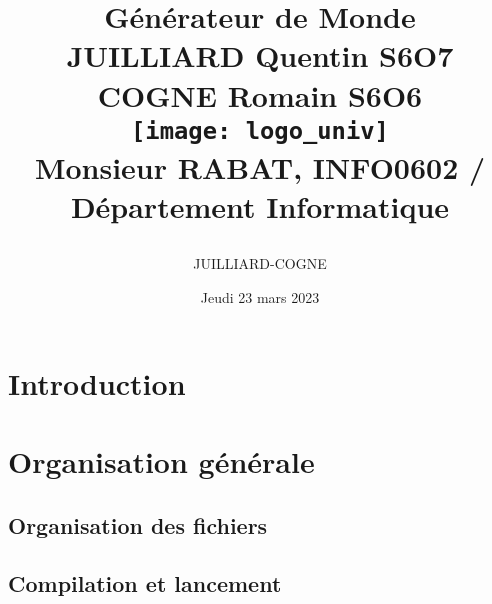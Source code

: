 \documentclass[a4paper, 11pt]{report}
\author{JUILLIARD-COGNE}
\begin{document}
\pagestyle{fancy}

\fancyhead{}\fancyfoot{}

\fancyhead[R]{\thepage} 

\begin{title}

\title{
    {\Huge Générateur de Monde }\\
    \vspace{1 cm}
    {\LARGE JUILLIARD Quentin S6O7}\\
    {\LARGE COGNE Romain S6O6}\\
    \vspace{2.5 cm}
    {\texttt{[image: logo\_univ]}}\\
    \vspace{2.5 cm}
    {\Large Monsieur RABAT, INFO0602 / Département Informatique}\\
    \vspace{1 cm}
    {\date{\Large Jeudi 23 mars 2023}}}
\end{title}

\maketitle
\tableofcontents
\clearpage


\section{Introduction}


\section{Organisation générale}


\subsection{Organisation des fichiers}


\subsection{Compilation et lancement}

\end{document}
